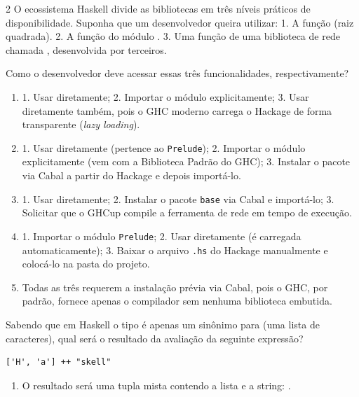 \documentclass[a4paper,10pt,brazil]{article}
\begin{document}
\begin{multicols}{2}
O ecossistema Haskell divide as bibliotecas em três níveis práticos de disponibilidade. Suponha que um desenvolvedor queira utilizar:
1. A função  (raiz quadrada).
2. A função  do módulo .
3. Uma função de uma biblioteca de rede chamada , desenvolvida por terceiros.

Como o desenvolvedor deve acessar essas três funcionalidades, respectivamente?

\begin{enumerate}
  \item 1. Usar diretamente; 2. Importar o módulo explicitamente; 3. Usar diretamente também, pois o GHC moderno carrega o Hackage de forma transparente (\emph{lazy loading}).

  \item 1. Usar diretamente (pertence ao \texttt{Prelude}); 2. Importar o módulo explicitamente (vem com a Biblioteca Padrão do GHC); 3. Instalar o pacote via Cabal a partir do Hackage e depois importá-lo.

  \item 1. Usar diretamente; 2. Instalar o pacote \texttt{base} via Cabal e importá-lo; 3. Solicitar que o GHCup compile a ferramenta de rede em tempo de execução.

  \item 1. Importar o módulo \texttt{Prelude}; 2. Usar diretamente (é carregada automaticamente); 3. Baixar o arquivo \texttt{.hs} do Hackage manualmente e colocá-lo na pasta do projeto.

  \item Todas as três requerem a instalação prévia via Cabal, pois o GHC, por padrão, fornece apenas o compilador sem nenhuma biblioteca embutida.


\end{enumerate}

Sabendo que em Haskell o tipo  é apenas um sinônimo para \haskellinline{[Char]} (uma lista de caracteres), qual será o resultado da avaliação da seguinte expressão?
\begin{verbatim}
['H', 'a'] ++ "skell"
\end{verbatim}

\begin{enumerate}
  \item O resultado será uma tupla mista contendo a lista e a string: .


\end{enumerate}
\end{multicols}
\end{document}
